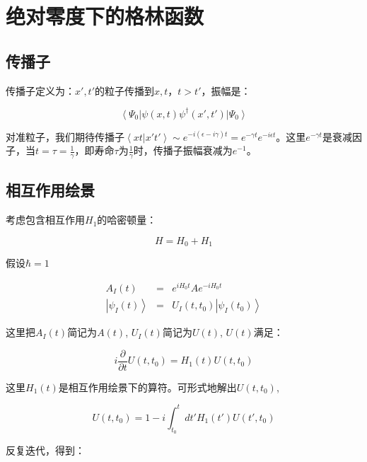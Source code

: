 \section{绝对零度下的格林函数}

\subsection{传播子}

传播子定义为：$x',t'$的粒子传播到$x,t$，$t > t'$，振幅是：

\begin{equation}
\left\langle  \Psi_0 \right| \psi(x,t) \psi^{\dagger}(x', t')  \left| \Psi_0 \right\rangle
\end{equation}

对准粒子，我们期待传播子$\left\langle xt | x't' \right\rangle \sim e^{-i (\epsilon - i \gamma ) t} = e^{-\gamma t } e^{-i \epsilon t} $。这里$e^{- \gamma t}$是衰减因子，当$t = \tau = \frac{1}{\gamma} $，即寿命$\tau$为$\frac{1}{\gamma}$时，传播子振幅衰减为$e^{-1}$。

\subsection{相互作用绘景}

考虑包含相互作用$H_1 $的哈密顿量：

\begin{equation}
H = H_0 + H_1
\end{equation}


假设$\hbar = 1$

\begin{eqnarray}
A_I (t) &=& e^{i H_0 t } A e^{- i H_0 t}\\
\left| \psi_I (t) \right\rangle &=& U_I (t, t_0) \left| \psi_I (t_0) \right\rangle 
\end{eqnarray}

这里把$A_I (t)$简记为$A(t)$, $U_I (t)$简记为$U(t)$, $U(t)$满足：

\begin{equation}
i \frac{\partial}{\partial t} U(t, t_0) = H_1 (t) U (t, t_0) 
\end{equation}

这里$H_1 (t)$是相互作用绘景下的算符。可形式地解出$U(t,t_0)$,

\begin{equation}
U(t, t_0) = 1  -  i \int_{t_0}^t dt' H_1(t') U(t', t_0)
\end{equation}

反复迭代，得到：

